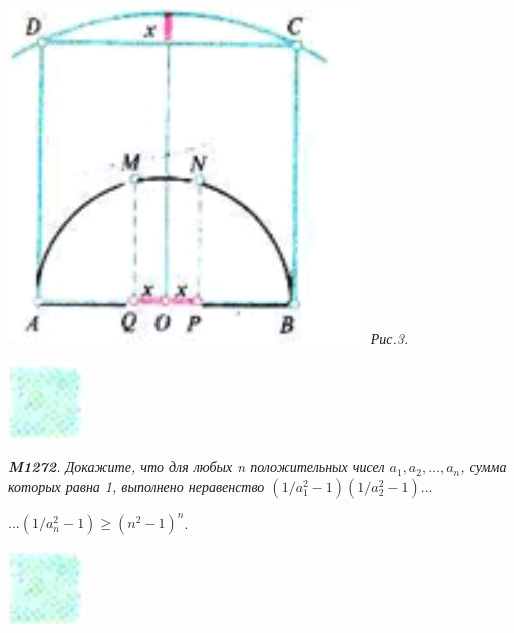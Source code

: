     \begin{minipage}{0.25\textwidth}
    \vspace{1.3cm}
    \includegraphics[scale=0.8]{pic3}
    \it Рис.3. \par
    \vspace{0.6cm}
    \hspace*{\fill} \includegraphics[scale=0.8]{cube.png} \par
    \it \textbf{M1272}. Докажите, что для любых n положительных чисел $a_1, a_2, ..., a_n$, сумма которых равна 1, выполнено неравенство 
    \vspace{3pt}
    \hspace*{\fill} $(1/a^2_1-1)(1/a^2_2-1)...$\par \hspace*{\fill} $...(1/a^2_n-1)\geq(n^2-1)^n$.
    
    \vspace{2.8cm}
    \hspace*{\fill} \includegraphics[scale=0.8]{cube.png}
    \end{minipage}
    \hspace{0.8cm}
